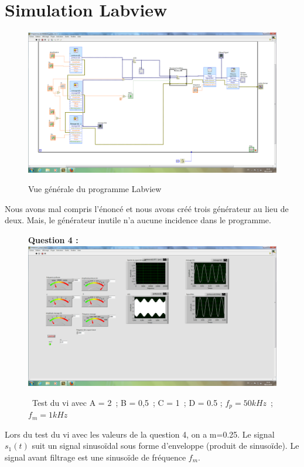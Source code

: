 \documentclass[french, a4paper,12pt, titlepage]{article}
\begin{document}
\newpage
\part*{\textbf{Simulation Labview}}

\begin{figure}[!h]
	\includegraphics[width=\textwidth]{vuegenerale.png} \\
	\caption{Vue générale du programme Labview}
\end{figure}

	Nous avons mal compris l'énoncé et nous avons créé trois générateur au lieu de deux.
	Mais, le générateur inutile n'a aucune incidence dans le programme.

\begin{figure}[!h]
	\textbf{Question 4 : \\}
	\includegraphics[width=\textwidth]{question4.png}
	\caption{ Test du vi avec  A = 2 ; B = 0,5 ; C = 1 ; D = 0.5 ; $f_p = 50kHz$ ; $f_m = 1kHz$}
\end{figure}

	Lors du test du vi avec les valeurs de la question 4, on a m=0.25.
	Le signal  $s_1(t)$ suit un signal sinusoïdal sous forme d’enveloppe (produit de sinusoïde).
	Le signal avant filtrage est une sinusoïde de fréquence $f_m$.
\end{document}
